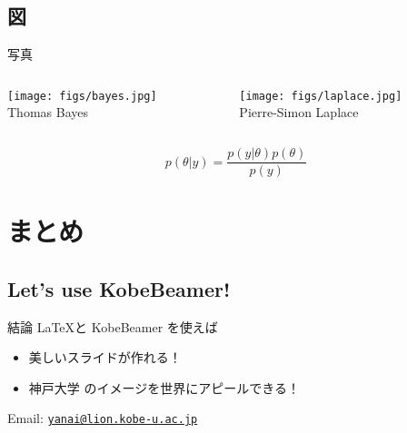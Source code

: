\documentclass[dvipdfmx]{beamer}
\begin{document}
\subsection{図}

{
}


\begin{frame}{写真}
  \begin{columns}[t]
    \begin{column}{0.5\textwidth}
     \centering
     \texttt{[image: figs/bayes.jpg]}\\
     Thomas Bayes
   \end{column}
    \begin{column}{0.5\textwidth}
     \centering
     \texttt{[image: figs/laplace.jpg]}\\
     Pierre-Simon Laplace
   \end{column}
 \end{columns}
 \vspace{12pt}
 \[
  p(\theta | y) = \frac{p(y | \theta)p(\theta)}{p(y)}
 \]
\end{frame}


\section{まとめ}
\subsection{Let's use KobeBeamer!}

\begin{frame}{結論}
 \LaTeX と KobeBeamer を使えば
 \begin{itemize}
  \item 美しいスライドが作れる！
  \item \alert{神戸大学} のイメージを世界にアピールできる！
 \end{itemize}
 \pause
 \vspace{36pt}
 
 \hspace{2em} Email: 
 \href{mailto:yanai@lion.kobe-u.ac.jp}{\texttt{yanai@lion.kobe-u.ac.jp}}
 \end{frame}
\end{document}
